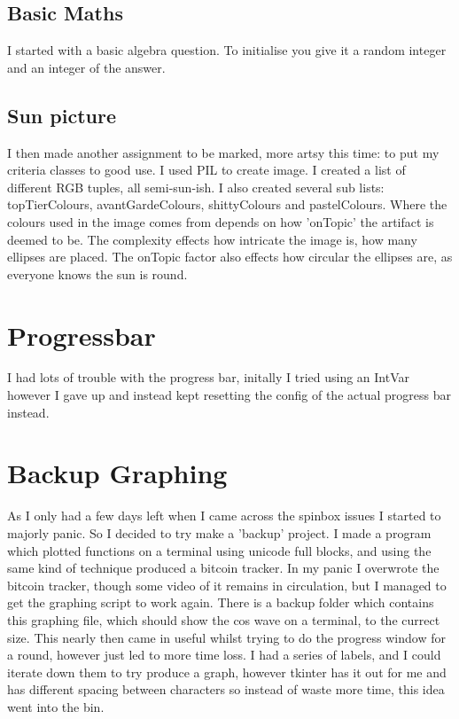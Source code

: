\documentclass[twocolumn]{article}   %
\begin{document}
  \subsection{Basic Maths}
  I started with a basic algebra question. To initialise you give it a random integer and an integer of the answer.
  \subsection{Sun picture}
  I then made another assignment to be marked, more artsy this time: to put my criteria classes to good use. I used PIL to create image. I created a list of different RGB tuples, all semi-sun-ish. I also created several sub lists: topTierColours, avantGardeColours, shittyColours and pastelColours. Where the colours used in the image comes from depends on how 'onTopic' the artifact is deemed to be. The complexity effects how intricate the image is, how many ellipses are placed. The onTopic factor also effects how circular the ellipses are, as everyone knows the sun is round.

\section{Progressbar}
I had lots of trouble with the progress bar, initally I tried using an IntVar however I gave up and instead kept resetting the config of the actual progress bar instead.

\section{Backup Graphing}
As I only had a few days left when I came across the spinbox issues I started to majorly panic. So I decided to try make a 'backup' project. I made a program which plotted functions on a terminal using unicode full blocks, and using the same kind of technique produced a bitcoin tracker. In my panic I overwrote the bitcoin tracker, though some video of it remains in circulation, but I managed to get the graphing script to work again. There is a backup folder which contains this graphing file, which should show the cos wave on a terminal, to the currect size. This nearly then came in useful whilst trying to do the progress window for a round, however just led to more time loss. I had a series of labels, and I could iterate down them to try produce a graph, however tkinter has it out for me and has different spacing between characters so instead of waste more time, this idea went into the bin.
\end{document}
